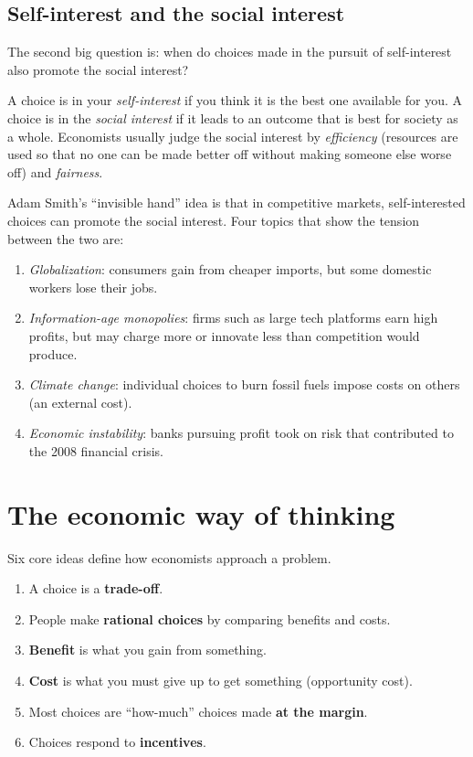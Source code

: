 \subsection{Self-interest and the social interest}

The second big question is: when do choices made in the pursuit of self-interest also
promote the social interest?

\begin{definition}
A choice is in your \emph{self-interest} if you think it is the best one available for
you. A choice is in the \emph{social interest} if it leads to an outcome that is best
for society as a whole. Economists usually judge the social interest by
\emph{efficiency} (resources are used so that no one can be made better off without
making someone else worse off) and \emph{fairness}.
\end{definition}

Adam Smith's ``invisible hand'' idea is that in competitive markets, self-interested
choices can promote the social interest. Four topics that show the tension between the
two are:
\begin{enumerate}
  \item \emph{Globalization}: consumers gain from cheaper imports, but some domestic
        workers lose their jobs.
  \item \emph{Information-age monopolies}: firms such as large tech platforms earn high
        profits, but may charge more or innovate less than competition would produce.
  \item \emph{Climate change}: individual choices to burn fossil fuels impose costs on
        others (an external cost).
  \item \emph{Economic instability}: banks pursuing profit took on risk that contributed
        to the 2008 financial crisis.
\end{enumerate}

\section{The economic way of thinking}

Six core ideas define how economists approach a problem.
\begin{enumerate}
  \item A choice is a \textbf{trade-off}.
  \item People make \textbf{rational choices} by comparing benefits and costs.
  \item \textbf{Benefit} is what you gain from something.
  \item \textbf{Cost} is what you must give up to get something (opportunity cost).
  \item Most choices are ``how-much'' choices made \textbf{at the margin}.
  \item Choices respond to \textbf{incentives}.
\end{enumerate}


